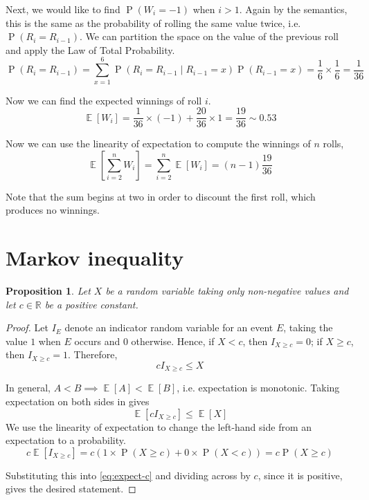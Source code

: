 \documentclass[letterpaper,11pt]{article}
\newtheorem{prop}{Proposition}
\DeclareMathOperator{\Prob}{P}
\renewcommand{\P}[1]{\Prob{\parens{#1}}}
\DeclareMathOperator{\Expect}{\mathbb{E}}
\newcommand{\E}[1]{\Expect{\left[#1\right]}}
\newcommand{\R}{\mathbb{R}}
\newcommand{\parens}[1]{\left(#1\right)}
\newcommand{\given}{\;\vert\;}
\newcommand{\question}{\section}
\begin{document}
Next, we would like to find $\P{W_i = -1}$ when $i > 1$.
Again by the semantics, this is the same as the probability of rolling the same
value twice, i.e. $\P{R_i = R_{i-1}}$. We can partition the space on the value
of the previous roll and apply the Law of Total Probability.
\begin{equation*}
    \P{R_i = R_{i-1}}
    = \sum_{x = 1}^6 {
        \P{R_i = R_{i-1} \given R_{i-1} = x} \P{R_{i-1} = x}
    }
    = \frac{1}{6} \times \frac{1}{6}
    = \frac{1}{36}
\end{equation*}

Now we can find the expected winnings of roll $i$.
\begin{equation*}
    \E{W_i}
    = \frac{1}{36} \times (-1)
    + \frac{20}{36} \times 1
    = \frac{19}{36}
    \sim 0.53
\end{equation*}

Now we can use the linearity of expectation to compute the winnings of $n$
rolls,
\begin{equation*}
    \E{\sum_{i=2}^n W_i} = \sum_{i=2}^n \E{W_i} = (n-1)\frac{19}{36}
\end{equation*}

Note that the sum begins at two in order to discount the first roll, which
produces no winnings.

\question{Markov inequality}

\begin{prop}
    Let $X$ be a random variable taking only non-negative values and let
    $c \in \R$ be a positive constant.
\end{prop}

\begin{proof}
    Let $I_E$ denote an indicator random variable for an event $E$, taking the
    value $1$ when $E$ occurs and $0$ otherwise.
    Hence, if $X < c$, then $I_{X \geq c} = 0$;
    if $X \geq c$, then $I_{X \geq c} = 1$.
    Therefore,
    \begin{equation}
        \label{eq:indicate-c}
        c I_{X \geq c} \leq X
    \end{equation}

    In general, $A < B \implies \E{A} < \E{B}$, i.e. expectation is monotonic.
    Taking expectation on both sides in \label{eq:indicate-c} gives
    \begin{equation}
        \label{eq:expect-c}
        \E{c I_{X \geq c}} \leq \E{X}
    \end{equation}
    We use the linearity of expectation to change the left-hand side from an
    expectation to a probability.
    \begin{equation*}
        c \E{I_{X \geq c}}
        = c \parens{
            1 \times \P{X \geq c}
            + 
            0 \times \P{X < c}
        }
        = c \P{X \geq c}
    \end{equation*}

    Substituting this into \eqref{eq:expect-c} and dividing across by $c$,
    since it is positive, gives the desired statement.
\end{proof}
\end{document}
